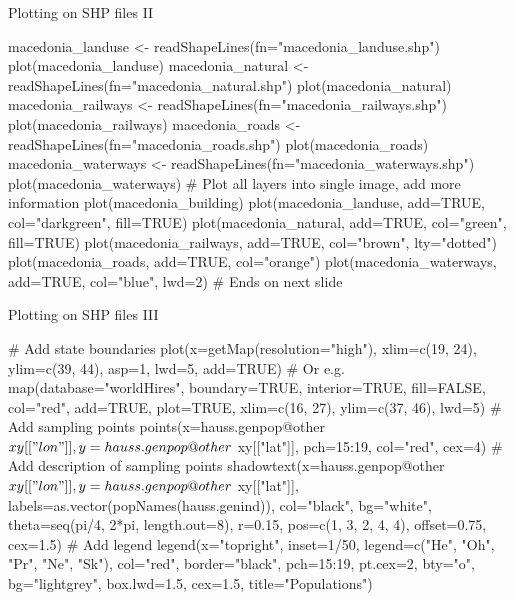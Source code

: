\documentclass[compress, ucs, xelatex, 11pt, xcolor=svgnames, aspectratio=169,
	hyperref={
		bookmarks=true,
		unicode=true,
		colorlinks=true,
		pdftitle={Molecular data in R},
		plainpages=false,
		pdfauthor={Vojtech Zeisek},
		pdfsubject={Course about phylogeny and evolution in R},
		pdfcreator={XeLaTeX},
		pdfkeywords={R, evolution, phylogeny, molecular data},
		linkcolor=Crimson, %
		anchorcolor=Magenta, %
		citecolor=Magenta, %
		filecolor=Magenta, %
		menucolor=Magenta, %
		urlcolor=DodgerBlue, %
		pdftex},
	url={hyphens, lowtilde} %
	]{beamer}
\begin{document}
\begin{frame}[fragile]{Plotting on SHP files II}
	\begin{spluscode}
    macedonia_landuse <- readShapeLines(fn="macedonia_landuse.shp")
    plot(macedonia_landuse)
    macedonia_natural <- readShapeLines(fn="macedonia_natural.shp")
    plot(macedonia_natural)
    macedonia_railways <- readShapeLines(fn="macedonia_railways.shp")
    plot(macedonia_railways)
    macedonia_roads <- readShapeLines(fn="macedonia_roads.shp")
    plot(macedonia_roads)
    macedonia_waterways <- readShapeLines(fn="macedonia_waterways.shp")
    plot(macedonia_waterways)
    # Plot all layers into single image, add more information
    plot(macedonia_building)
    plot(macedonia_landuse, add=TRUE, col="darkgreen", fill=TRUE)
    plot(macedonia_natural, add=TRUE, col="green", fill=TRUE)
    plot(macedonia_railways, add=TRUE, col="brown", lty="dotted")
    plot(macedonia_roads, add=TRUE, col="orange")
    plot(macedonia_waterways, add=TRUE, col="blue", lwd=2) # Ends on next slide
	\end{spluscode}
\end{frame}

\begin{frame}[fragile]{Plotting on SHP files III}
	\begin{spluscode}
    # Add state boundaries
    plot(x=getMap(resolution="high"), xlim=c(19, 24), ylim=c(39, 44), asp=1,
      lwd=5, add=TRUE) # Or e.g.
    map(database="worldHires", boundary=TRUE, interior=TRUE, fill=FALSE,
      col="red", add=TRUE, plot=TRUE, xlim=c(16, 27), ylim=c(37, 46), lwd=5)
    # Add sampling points
    points(x=hauss.genpop@other$xy[["lon"]], y=hauss.genpop@other$
      xy[["lat"]], pch=15:19, col="red", cex=4)
    # Add description of sampling points
    shadowtext(x=hauss.genpop@other$xy[["lon"]], y=hauss.genpop@other$
      xy[["lat"]], labels=as.vector(popNames(hauss.genind)), col="black",
      bg="white", theta=seq(pi/4, 2*pi, length.out=8), r=0.15,
      pos=c(1, 3, 2, 4, 4), offset=0.75, cex=1.5)
    # Add legend
    legend(x="topright", inset=1/50, legend=c("He", "Oh", "Pr", "Ne", "Sk"),
      col="red", border="black", pch=15:19, pt.cex=2, bty="o", bg="lightgrey",
      box.lwd=1.5, cex=1.5, title="Populations")
	\end{spluscode}
\end{frame}
\end{document}
